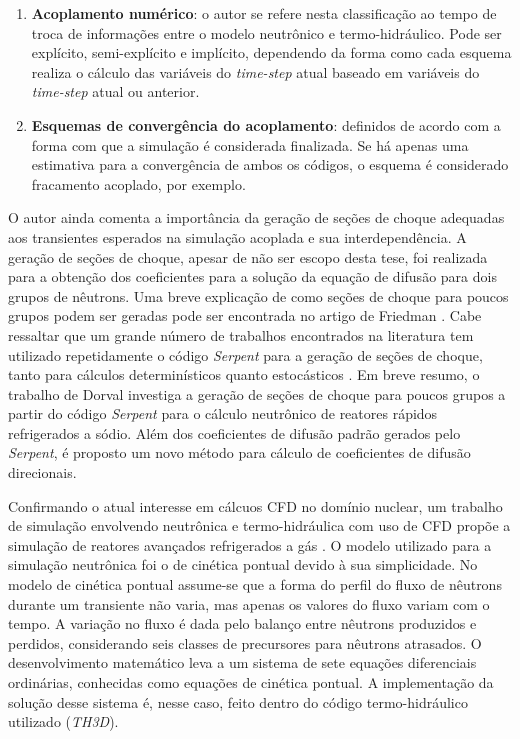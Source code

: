 \begin{enumerate}
\item \textbf{Acoplamento numérico}: o autor se refere nesta classificação ao tempo de troca de informações entre o modelo 
neutrônico e termo-hidráulico. Pode ser explícito, semi-explícito e implícito, dependendo da forma como cada esquema 
realiza o cálculo das variáveis do \textit{time-step} atual baseado em variáveis do \textit{time-step} atual ou 
anterior.
\item \textbf{Esquemas de convergência do acoplamento}: definidos de acordo com a forma com que a simulação é considerada 
finalizada. Se há apenas uma estimativa para a convergência de ambos os códigos, o esquema é considerado fracamento 
acoplado, por exemplo.
\end{enumerate}

O autor ainda comenta a importância da geração de seções de choque adequadas aos transientes esperados na 
simulação acoplada e sua interdependência. A geração de seções de choque, apesar de não ser escopo desta tese,
foi realizada para a obtenção dos coeficientes para a solução da equação de difusão para dois grupos de nêutrons.
Uma breve explicação de como seções de choque para poucos grupos podem ser geradas pode ser encontrada no
artigo de Friedman \cite{Friedman2013}. Cabe ressaltar que um grande número de trabalhos encontrados
na literatura tem utilizado repetidamente o código \textit{Serpent} \cite{Serpent2013} para
a geração de seções de choque, tanto para cálculos determinísticos quanto estocásticos \cite{Jareteg2014}. Em breve resumo, o trabalho de Dorval \cite{Dorval2015} investiga
a geração de seções de choque para poucos grupos a partir do código \textit{Serpent} para
o cálculo neutrônico de reatores rápidos refrigerados a sódio. Além dos coeficientes de
difusão padrão gerados pelo \textit{Serpent}, é proposto um novo método para cálculo de
coeficientes de difusão direcionais. 

Confirmando o atual interesse em cálcuos CFD no domínio nuclear, um trabalho de simulação envolvendo
neutrônica e termo-hidráulica com uso de CFD propõe a simulação de reatores avançados refrigerados
a gás \cite{Hossain2011}. O modelo utilizado 
para a simulação neutrônica foi o de cinética pontual devido à sua simplicidade. No modelo 
de cinética pontual assume-se que a forma do perfil do fluxo de nêutrons durante um transiente 
não varia, mas apenas os valores do fluxo variam com o tempo. A variação no fluxo é dada 
pelo balanço entre nêutrons produzidos e perdidos, considerando seis classes de precursores 
para nêutrons atrasados. O desenvolvimento matemático leva a um sistema de sete equações diferenciais 
ordinárias, conhecidas como equações de cinética pontual. A implementação da solução desse sistema 
é, nesse caso, feito dentro do código termo-hidráulico utilizado (\textit{TH3D}).

